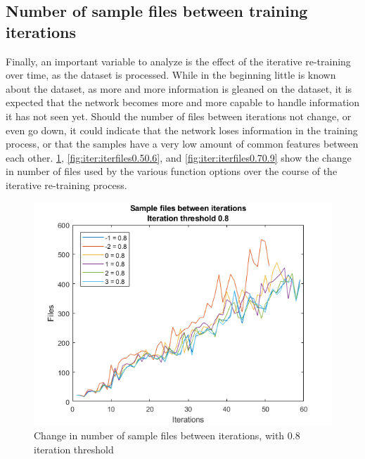 \subsection{Number of sample files between training iterations}
Finally, an important variable to analyze is the effect of the iterative re-training over time, as the dataset is processed.
While in the beginning little is known about the dataset, as more and more information is gleaned on the dataset, it is expected that the network becomes more and more capable to handle information it has not seen yet.
Should the number of files between iterations not change, or even go down, it could indicate that the network loses information in the training process, or that the samples have a very low amount of common features between each other.
\cref{fig:iter:iterfiles0.8}, \cref{fig:iter:iterfiles0.50.6}, and \cref{fig:iter:iterfiles0.70.9} show the change in number of files used by the various function options over the course of the iterative re-training process.

\begin{figure}  %
  \centering
  \includegraphics[width=.7\textwidth]{figures/iterfiles-0.8.png}
  \caption{Change in number of sample files between iterations, with 0.8 iteration threshold}
  \label{fig:iter:iterfiles0.8}
\end{figure}

